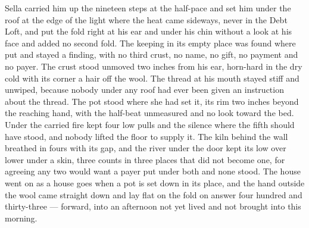 Sella carried him up the nineteen steps at the half-pace and set him under the roof at the edge of the light where the heat came sideways, never in the Debt Loft, and put the fold right at his ear and under his chin without a look at his face and added no second fold. The keeping in its empty place was found where put and stayed a finding, with no third crust, no name, no gift, no payment and no payer. The crust stood unmoved two inches from his ear, horn-hard in the dry cold with its corner a hair off the wool. The thread at his mouth stayed stiff and unwiped, because nobody under any roof had ever been given an instruction about the thread. The pot stood where she had set it, its rim two inches beyond the reaching hand, with the half-beat unmeasured and no look toward the bed. Under  the carried fire kept four low pulls and the silence where the fifth should have stood, and nobody lifted the floor to supply it. The kiln behind the wall breathed in fours with its gap, and the river under the door kept its low over lower under a skin, three counts in three places that did not become one, for agreeing any two would want a payer put under both and none stood. The house went on as a house goes when a pot is set down in its place, and the hand outside the wool came straight down and lay flat on the fold on answer four hundred and thirty-three --- forward, into an afternoon not yet lived and not brought into this morning.
